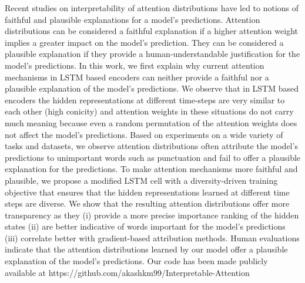Recent studies on interpretability of attention distributions have led to notions of faithful and plausible explanations for a model's predictions. Attention distributions can be considered a faithful explanation if a higher attention weight implies a greater impact on the model's prediction. They can be considered a plausible explanation if they provide a human-understandable justification for the model's predictions. In this work, we first explain why current attention mechanisms in LSTM based encoders can neither provide a faithful nor a plausible explanation of the model's predictions. We observe that in LSTM based encoders the hidden representations at different time-steps are very similar to each other (high conicity) and attention weights in these situations do not carry much meaning because even a random permutation of the attention weights does not affect the model's predictions. Based on experiments on a wide variety of tasks and datasets, we observe attention distributions often attribute the model's predictions to unimportant words such as punctuation and fail to offer a plausible explanation for the predictions. To make attention mechanisms more faithful and plausible, we propose a modified LSTM cell with a diversity-driven training objective that ensures that the hidden representations learned at different time steps are diverse. We show that the resulting attention distributions offer more transparency as they (i) provide a more precise importance ranking of the hidden states (ii) are better indicative of words important for the model's predictions (iii) correlate better with gradient-based attribution methods. Human evaluations indicate that the attention distributions learned by our model offer a plausible explanation of the model's predictions. Our code has been made publicly available at https://github.com/akashkm99/Interpretable-Attention
